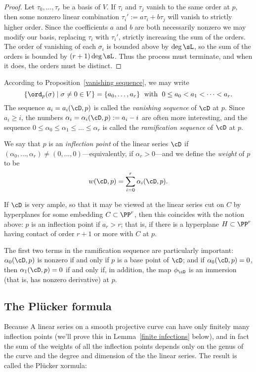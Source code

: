 \begin{proof} Let $\tau_0, \dots, \tau_r$ be a basis of $V$.  If  $\tau_i$ and $\tau_j$ vanish to the same order at $p$, then 
some nonzero linear combination $\tau_i' := a\tau_i+b\tau_j$  will vanish to strictly higher order. Since the coefficients $a$ and $b$ are both necessarily nonzero we may modify our basis, replacing $\tau_i$ with $\tau_i'$, strictly increasing the sum of the orders. 
The order of vanishing of each $\sigma_i$ is bounded above by $\deg \sL$, so the sum of the orders is bounded by $(r+1)\deg \sL$. Thus the process must terminate, and when it does,
 the orders must be distinct. \end{proof}

According to  Proposition~\ref{vanishing sequence}, we may write
$$
\{ \ord_p(\sigma) \mid \sigma \neq 0 \in V \} = \{a_0,\dots,a_r\} \; \text{ with } \; 0\leq a_0 < a_1 < \dots < a_r.
$$
The sequence $a_i = a_i(\cD,p)$ is called the \emph{vanishing sequence} of $\cD$ at $p$.  Since $a_i \geq i$, the numbers $\alpha_i = \alpha_i(\cD,p) := a_i - i$ are often more interesting, and the sequence $0 \leq \alpha_0 \leq \alpha_1 \leq \dots \leq \alpha_r$ is called the \emph{ramification sequence} of $\cD$ at $p$. 

We say that $p$ is an \emph{inflection point} of the linear series $\cD$ if $(\alpha_0,\dots,\alpha_r) \neq (0,\dots,0)$---equivalently, if $\alpha_r > 0$---and we define the \emph{weight} of $p$ to be
$$
w(\cD, p) = \sum_{i=0}^r \alpha_i(\cD, p).
$$

If $\cD$ is very ample, so that it may be viewed at the linear series cut on $C$ by hyperplanes for some embedding $C \subset \PP^r$, then this coincides with the notion above: $p$ is an inflection point if $a_r > r$; that is, if there is a hyperplane $H \subset \PP^r$ having contact of order $r+1$ or more with $C$ at $p$.

The first two terms in the ramification sequence are particularly important: $\alpha_0(\cD, p)$ is nonzero if and only if $p$ is a base point of $\cD$; and if $\alpha_0(\cD, p)=0$, then $\alpha_1(\cD, p) = 0$ if and only if, in addition, the map $\phi_\cD$ is an immersion (that is, has nonzero derivative) at $p$.


\subsection{The Pl\"ucker formula}

Because A linear series on a smooth projective curve can have only finitely many inflection points (we'll prove this in Lemma~\ref{finite infections} below), and in fact the sum of the weights of all the inflection points depends only on the genus of the curve and the degree and dimension of the the linear series. The result is called the Pl\"ucker xormula:

